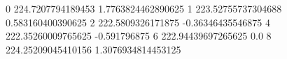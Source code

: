 0 224.7207794189453 1.7763824462890625
1 223.52755737304688 0.583160400390625
2 222.5809326171875 -0.36346435546875
4 222.35260009765625 -0.591796875
6 222.94439697265625 0.0
8 224.25209045410156 1.3076934814453125
